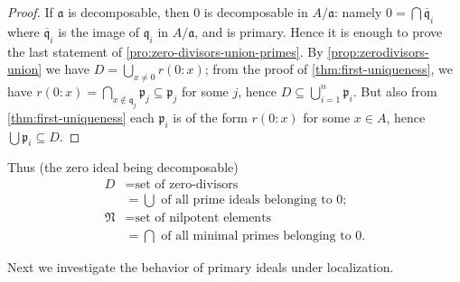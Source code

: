 \begin{proof}
    If $\mathfrak{a}$ is decomposable, then $0$ is decomposable in $A/\mathfrak{a}$: namely $0 = \bigcap \overline{\mathfrak{q}}_i$ where $\overline{\mathfrak{q}}_i$ is the image of $\mathfrak{q}_i$ in $A/\mathfrak{a}$, and is primary. Hence it is enough to prove the last statement of \eqref{pro:zero-divisors-union-primes}. By \eqref{prop:zerodivisors-union} we have $D = \bigcup_{x \neq 0} r(0:x)$; from the proof of \eqref{thm:first-uniqueness}, we have $r(0:x) = \bigcap_{x \notin \mathfrak{q}_j} \mathfrak{p}_j \subseteq \mathfrak{p}_j$ for some $j$, hence $D \subseteq \bigcup_{i=1}^n \mathfrak{p}_i$. But also from \eqref{thm:first-uniqueness} each $\mathfrak{p}_i$ is of the form $r(0:x)$ for some $x \in A$, hence $\bigcup \mathfrak{p}_i \subseteq D$.
\end{proof}

Thus (the zero ideal being decomposable)
\[
\begin{aligned}
D &= \text{set of zero-divisors} \\
&= \bigcup \text{ of all prime ideals belonging to } 0; \\
\mathfrak{N} &= \text{set of nilpotent elements} \\
&= \bigcap \text{ of all minimal primes belonging to } 0.
\end{aligned}
\]

Next we investigate the behavior of primary ideals under localization.


